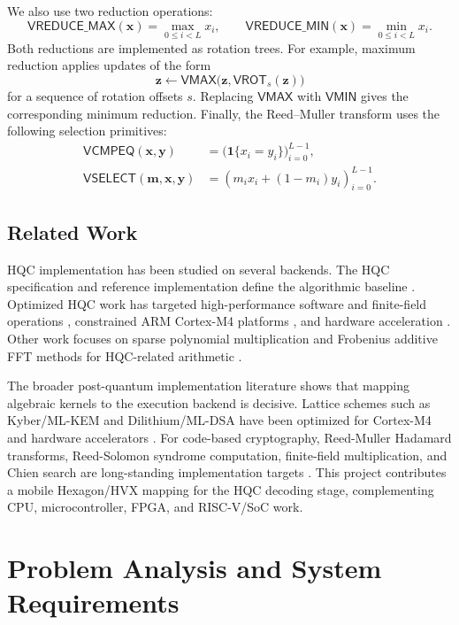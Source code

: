 \documentclass[12pt,a4paper]{report}
\begin{document}
We also use two reduction operations:
\[
    \mathsf{VREDUCE\_MAX}(\mathbf{x})=\max_{0\le i<L}x_i,
    \qquad
    \mathsf{VREDUCE\_MIN}(\mathbf{x})=\min_{0\le i<L}x_i.
\]
Both reductions are implemented as rotation trees. For example, maximum reduction applies updates of the form
\[
    \mathbf{z}
    \leftarrow
    \mathsf{VMAX}
    \bigl(
        \mathbf{z},
        \mathsf{VROT}_{s}(\mathbf{z})
    \bigr)
\]
for a sequence of rotation offsets $s$. Replacing $\mathsf{VMAX}$ with $\mathsf{VMIN}$ gives the corresponding minimum reduction. Finally, the Reed--Muller transform uses the following selection primitives:
\[
\begin{aligned}
\mathsf{VCMPEQ}(\mathbf{x},\mathbf{y})
    &=
    \bigl(\mathbf{1}\{x_i=y_i\}\bigr)_{i=0}^{L-1},\\
\mathsf{VSELECT}(\mathbf{m},\mathbf{x},\mathbf{y})
    &=
    (m_i x_i+(1-m_i)y_i)_{i=0}^{L-1}.
\end{aligned}
\]

\section{Related Work}
HQC implementation has been studied on several backends. The HQC specification and reference implementation define the algorithmic baseline \cite{hqc-spec}. Optimized HQC work has targeted high-performance software and finite-field operations \cite{opthqc2025}, constrained ARM Cortex-M4 platforms \cite{kim2025,aissaoui2024}, and hardware acceleration \cite{deshpande2023,antognazza2025}. Other work focuses on sparse polynomial multiplication and Frobenius additive FFT methods for HQC-related arithmetic \cite{tu2023,ras2025}.

The broader post-quantum implementation literature shows that mapping algebraic kernels to the execution backend is decisive. Lattice schemes such as Kyber/ML-KEM and Dilithium/ML-DSA have been optimized for Cortex-M4 and hardware accelerators \cite{abdulrahman2022,carril2024,urquhart2024}. For code-based cryptography, Reed-Muller Hadamard transforms, Reed-Solomon syndrome computation, finite-field multiplication, and Chien search are long-standing implementation targets \cite{chien1964,berlekamp1968}. This project contributes a mobile Hexagon/HVX mapping for the HQC decoding stage, complementing CPU, microcontroller, FPGA, and RISC-V/SoC work.

\chapter{Problem Analysis and System Requirements}
\label{chap:requirements}
\end{document}
